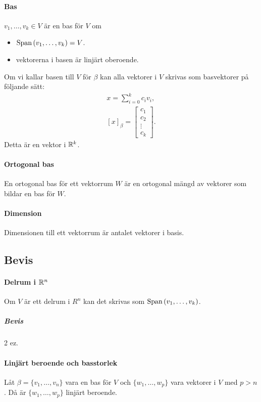 \paragraph{Bas}
$v_1, \dots, v_k\in V$ är en bas för $V$ om
\begin{itemize}
	\item $\text{Span}\left(v_1, \dots, v_k\right) = V$.
	\item vektorerna i basen är linjärt oberoende.
\end{itemize}
Om vi kallar basen till $V$ för $\beta$ kan alla vektorer i $V$ skrivas som basvektorer på följande sätt:
\begin{align*}
	x = \sum\limits_{i = 0}^{k}c_iv_i, \\
	[x]_\beta =
	\left[\begin{array}{c}
		c_1 \\
		c_2 \\
		\vdots \\
		c_k
	\end{array}\right].
\end{align*}
Detta är en vektor i $\mathbb{R}^k$.

\paragraph{Ortogonal bas}
En ortogonal bas för ett vektorrum $W$ är en ortogonal mängd av vektorer som bildar en bas för $W$.

\paragraph{Dimension}
Dimensionen till ett vektorrum är antalet vektorer i basis.

\subsection{Bevis}

\paragraph{Delrum i $\mathbb{R}^n$}
Om $V$ är ett delrum i $R^n$ kan det skrivas som $\text{Span}\left(v_1, \dots, v_k\right)$.

\subparagraph{Bevis}
2 ez.

\paragraph{Linjärt beroende och basstorlek}
Låt $\beta = \{v_1, \dots, v_n\}$ vara en bas för $V$ och $\{w_1, \dots, w_p\}$ vara vektorer i $V$ med $p > n$. Då är $\{w_1, \dots, w_p\}$ linjärt beroende.

